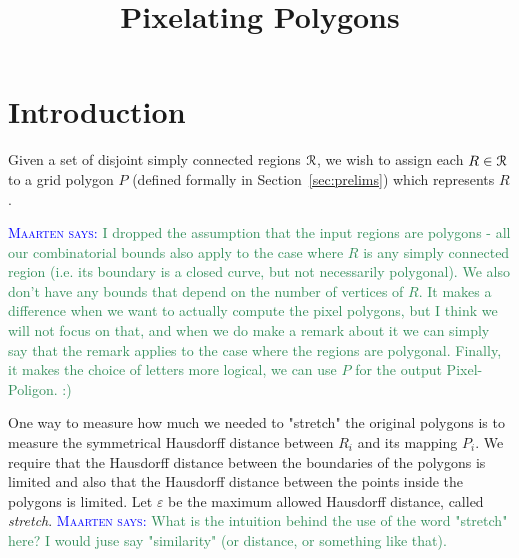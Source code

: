 \documentclass[a4paper, UKenglish]{lipics-v2018}
\title{Pixelating Polygons}
\newcommand{\mremark}[3]{\textcolor{blue}{\textsc{#1 #2:}} \textcolor{SeaGreen}{\textsf{#3}}}
\newcommand{\maarten}[2][says]{\mremark{Maarten}{#1}{#2}}
\newcommand{\pix}{\square}
\newcommand{\eps}{\varepsilon}
\begin{document}
\maketitle

\section{Introduction}

Given a set of disjoint simply connected regions $\cal R$, we wish to assign each $R \in \cal R$ to a grid polygon $P$ (defined formally in Section~\ref {sec:prelims}) which represents $R$.

\maarten {I dropped the assumption that the input regions are polygons - all our combinatorial bounds also apply to the case where $R$ is any simply connected region (i.e. its boundary is a closed curve, but not necessarily polygonal). We also don't have any bounds that depend on the number of vertices of $R$. It makes a difference when we want to actually compute the pixel polygons, but I think we will not focus on that, and when we do make a remark about it we can simply say that the remark applies to the case where the regions are polygonal.  Finally, it makes the choice of letters more logical, we can use $P$ for the output Pixel-Poligon. :)}



One way to measure how much we needed to "stretch" the original polygons is to measure the symmetrical Hausdorff distance between $R_i$ and its mapping $P_i$. 
We require that the Hausdorff distance between the boundaries of the polygons is limited and also that the Hausdorff distance between the points inside the polygons is limited.
Let $\eps$ be the maximum allowed Hausdorff distance, called \emph{stretch}.
\maarten {What is the intuition behind the use of the word "stretch" here? I would juse say "similarity" (or distance, or something like that).}
\end{document}
